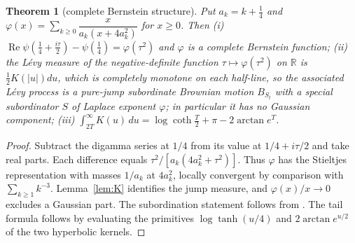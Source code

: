 \documentclass[10pt]{amsart}
\newtheorem{theorem}{Theorem}[section]
\theoremstyle{definition}
\theoremstyle{remark}
\newcommand{\R}{\mathbb R}
\newcommand{\Rel}{\operatorname{Re}}
\begin{document}
\begin{theorem}[complete Bernstein structure]\label{thm:S}
Put $a_k=k+\frac14$ and $\varphi(x)=\sum_{k\ge0}\dfrac{x}{a_k(x+4a_k^2)}$ for $x\ge0$. Then
\emph{(i)} $\Rel\psi(\frac14+\frac{i\tau}2)-\psi(\frac14)=\varphi(\tau^2)$ and $\varphi$ is a
complete Bernstein function; \emph{(ii)} the L\'evy measure of the negative-definite function
$\tau\mapsto\varphi(\tau^2)$ on $\R$ is $\frac12K(|u|)du$, which is completely monotone on each
half-line, so the associated L\'evy process is a pure-jump subordinate Brownian motion
$B_{S_t}$ with a special subordinator $S$ of Laplace exponent $\varphi$; in particular it has no
Gaussian component; \emph{(iii)} $\int_{2T}^\infty K(u)\,du=\log\coth\frac T2+\pi-2\arctan e^{T}$.
\end{theorem}
\begin{proof}
Subtract the digamma series at $1/4$ from its value at
$1/4+i\tau/2$ and take real parts. Each difference equals
$\tau^2/[a_k(4a_k^2+\tau^2)]$. Thus $\varphi$ has the Stieltjes
representation with masses $1/a_k$ at $4a_k^2$, locally convergent
by comparison with $\sum_{k\ge1}k^{-3}$. Lemma~\ref{lem:K} identifies
the jump measure, and $\varphi(x)/x\to0$ excludes a Gaussian part.
The subordination statement follows from \cite[Chs.~6,13]{SSV2012}.
The tail formula follows by evaluating the primitives
$\log\tanh(u/4)$ and $2\arctan e^{u/2}$ of the two hyperbolic kernels.
\end{proof}
\end{document}
